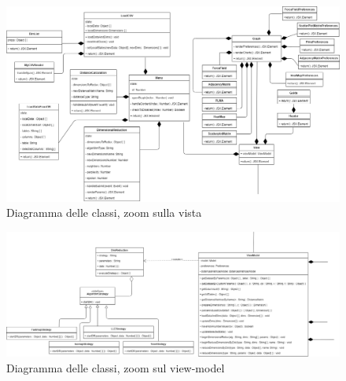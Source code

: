 \begin{landscape}
\vspace*{\fill}
\begin{figure}[hb]
\includegraphics[width=21cm]{Extra/Allegato Tecnico-View}
\centering
\caption{Diagramma delle classi, zoom sulla vista}
\end{figure}
\vfill
\end{landscape}

\begin{landscape}
\vspace*{\fill}
\begin{figure}[hb]
\includegraphics[width=\linewidth ]{Extra/Allegato Tecnico-ViewModel}
\centering
\caption{Diagramma delle classi, zoom sul view-model}
\end{figure}
\vfill
\end{landscape}
\newpage
